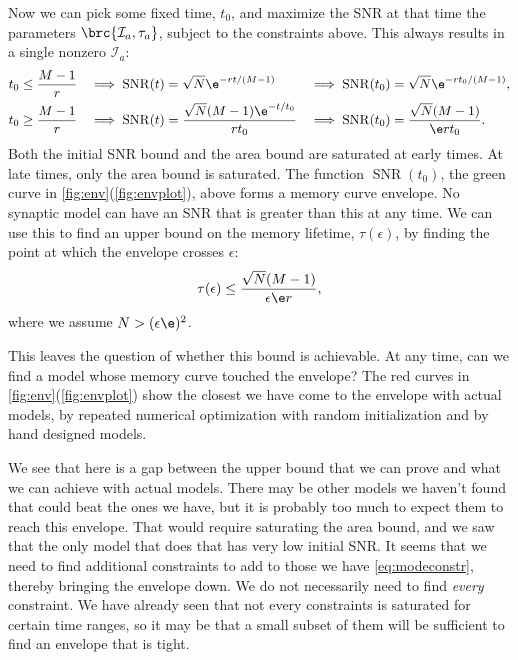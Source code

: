 \documentclass{article} %
\DeclareMathOperator{\snr}{SNR}
\newcommand{\CI}{\mathcal{I}}
\begin{document}
Now we can pick some fixed time, $t_0$, and maximize the SNR at that time \wrt the parameters $\brc{\CI_a,\tau_a}$, subject to the constraints above.
This always results in a single nonzero $\CI_a$:
%
\begin{equation}\label{eq:env}
\begin{aligned}
  t_0 &\leq \frac{M-1}{r} &
   \implies 
  \snr(t) &= \sqrt{N}\e^{-rt/(M-1)} &
   \implies 
  \snr(t_0) &= \sqrt{N}\e^{-rt_0/(M-1)},\\
  t_0 &\geq \frac{M-1}{r} &
   \implies 
  \snr(t) &= \frac{\sqrt{N}(M-1)\e^{-t/t_0}}{rt_0} &
   \implies 
  \snr(t_0) &= \frac{\sqrt{N}(M-1)}{\e rt_0}.
\end{aligned}
\end{equation}
%
Both the initial SNR bound and the area bound are saturated at early times.
At late times, only the area bound is saturated.
The function $\snr(t_0)$, the green curve in \autoref{fig:env}(\ref{fig:envplot}), above forms a memory curve envelope.
No synaptic model can have an SNR that is greater than this at any time.
We can use this to find an upper bound on the memory lifetime, $\tau(\epsilon)$, by finding the point at which the envelope crosses $\epsilon$:
%
\begin{equation}\label{eq:lifebound}
  \tau(\epsilon) \leq \frac{\sqrt{N}(M-1)}{\epsilon\e r},
\end{equation}
%
where we assume $N>(\epsilon\e)^2$.

This leaves the question of whether this bound is achievable.
At any time, can we find a model whose memory curve touched the envelope?
The red curves in \autoref{fig:env}(\ref{fig:envplot}) show the closest we have come to the envelope with actual models, by repeated numerical optimization with random initialization and by hand designed models.

We see that here is a gap between the upper bound that we can prove and what we can achieve with actual models.
There may be other models we haven't found that could beat the ones we have, but it is probably too much to expect them to reach this envelope.
That would require saturating the area bound, and we saw that the only model that does that has very low initial SNR.
It seems that we need to find additional constraints to add to those we have \eqref{eq:modeconstr}, thereby bringing the envelope down.
We do not necessarily need to find \emph{every} constraint.
We have already seen that not every constraints is saturated for certain time ranges, so it may be that a small subset of them will be sufficient to find an envelope that is tight.
\end{document}
